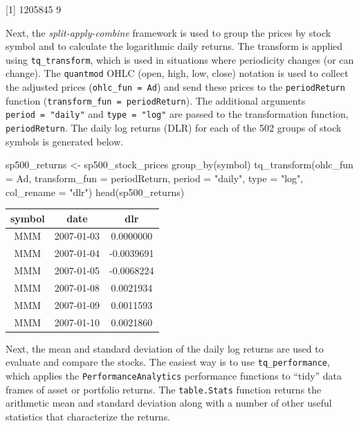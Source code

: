 {[}1{]} 1205845 9

\hspace{20 mm}

Next, the \emph{split-apply-combine} framework is used to group the
prices by stock symbol and to calculate the logarithmic daily returns.
The transform is applied using \texttt{tq\_transform}, which is used in
situations where periodicity changes (or can change). The
\texttt{quantmod} OHLC (open, high, low, close) notation is used to
collect the adjusted prices (\texttt{ohlc\_fun\ =\ Ad}) and send these
prices to the \texttt{periodReturn} function
(\texttt{transform\_fun\ =\ periodReturn}). The additional arguments
\texttt{period\ =\ "daily"} and \texttt{type\ =\ "log"} are passed to
the transformation function, \texttt{periodReturn}. The daily log
returns (DLR) for each of the 502 groups of stock symbols is generated
below.

\begin{Schunk}
\begin{Sinput}
sp500_returns <- sp500_stock_prices %
    group_by(symbol) %
    tq_transform(ohlc_fun = Ad, transform_fun = periodReturn, 
                 period = "daily", type = "log", col_rename = "dlr")
head(sp500_returns)
\end{Sinput}
\end{Schunk}

\begin{tabular}{ccc}
\toprule
symbol & date & dlr\\
\midrule
MMM & 2007-01-03 & 0.0000000\\
MMM & 2007-01-04 & -0.0039691\\
MMM & 2007-01-05 & -0.0068224\\
MMM & 2007-01-08 & 0.0021934\\
MMM & 2007-01-09 & 0.0011593\\
MMM & 2007-01-10 & 0.0021860\\
\bottomrule
\end{tabular}

\hspace{20 mm}

Next, the mean and standard deviation of the daily log returns are used
to evaluate and compare the stocks. The easiest way is to use
\texttt{tq\_performance}, which applies the
\texttt{PerformanceAnalytics} performance functions to ``tidy'' data
frames of asset or portfolio returns. The \texttt{table.Stats} function
returns the arithmetic mean and standard deviation along with a number
of other useful statistics that characterize the returns.

